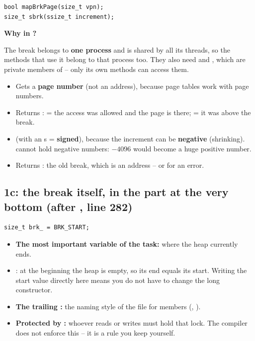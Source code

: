 \documentclass[11pt]{report}
\newcommand{\why}[1]{\par\smallskip\noindent\textbf{#1}\par\nopagebreak}
\begin{document}
\begin{lstlisting}[style=cpp]
bool mapBrkPage(size_t vpn);
size_t sbrk(ssize_t increment);
\end{lstlisting}

\why{Why in ?}
The break belongs to \textbf{one process} and is shared by all its threads, so the methods that use it
belong to that process too. They also need  and , which are
private members of  -- only its own methods can access them.

\why{}
\begin{itemize}
  \item Gets a \textbf{page number} (not an address), because page tables work with page numbers.
  \item Returns :  = the access was allowed and the page is there;
         = it was above the break.
\end{itemize}

\why{}
\begin{itemize}
  \item {} (with an s = \textbf{signed}), because the increment can be \textbf{negative}
        (shrinking).  cannot hold negative numbers: $-4096$ would become a huge positive number.
  \item Returns : the old break, which is an address -- or  for an error.
\end{itemize}

\subsection*{1c: the break itself, in the  part at the very bottom (after , line 282)}

\begin{lstlisting}[style=cpp]
size_t brk_ = BRK_START;
\end{lstlisting}

\begin{itemize}
  \item \textbf{The most important variable of the task:} where the heap currently ends.
  \item {}: at the beginning the heap is empty, so its end equals its start. Writing the
        start value directly here means you do not have to change the long constructor.
  \item \textbf{The trailing \code{\_}:} the naming style of the file for members (,
        ).
  \item \textbf{Protected by :} whoever reads or writes  must hold that
        lock. The compiler does not enforce this -- it is a rule you keep yourself.
\end{itemize}
\end{document}
